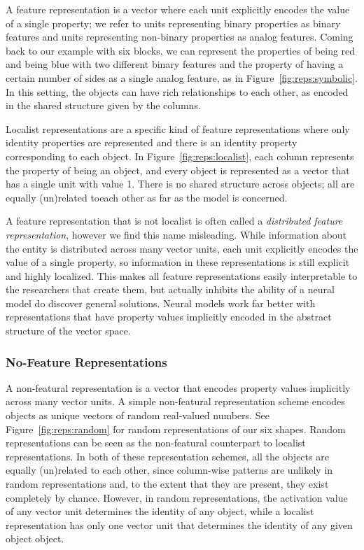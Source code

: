 \documentclass{article}
\newcommand{\figref}[1]{Figure~\ref{#1}}
\begin{document}
{A feature representation is a vector where each unit explicitly encodes the value of a single property; we refer to units representing binary properties as binary features and units representing non-binary properties as analog features. Coming back to our example with six blocks, we can represent the properties of being red and being blue with two different binary features and the property of having a certain number of sides as a single analog feature, as in \figref{fig:reps:symbolic}.  In this setting, the objects can have rich relationships to each other, as encoded in the shared structure given by the columns.

Localist representations are a specific kind of feature representations where only identity properties are represented and there is an identity property corresponding to each object. In \figref{fig:reps:localist}, each column represents the property of being an object, and every object is represented as a vector that has a single unit with value 1.  There is no shared structure across objects; all are equally (un)related toeach other as far as the model is concerned.  

A feature representation that is not localist is often called a \textit{distributed feature representation}, however we find this name misleading. While information about the entity is distributed across many vector units, each unit explicitly encodes the value of a single property, so information in these representations is still explicit and highly localized. This makes all feature representations easily interpretable to the researchers that create them, but actually inhibits the ability of a neural model do discover general solutions. Neural models work far better with representations that have property values implicitly encoded in the abstract structure of the vector space.


\subsubsection{No-Feature Representations}

A non-featural representation is a vector that encodes property values implicitly across many vector units. A simple non-featural representation scheme encodes objects as unique vectors of random real-valued numbers. See \figref{fig:reps:random} for random representations of our six shapes. Random representations can be seen as the non-featural counterpart to localist representations. In both of these representation schemes, all the objects are equally (un)related to each other, since column-wise patterns are unlikely in random representations and, to the extent that they are present, they exist completely by chance. However, in random representations, the activation value of any vector unit determines the identity of any object, while a localist representation has only one vector unit that determines the identity of any given object object.

}
\end{document}
